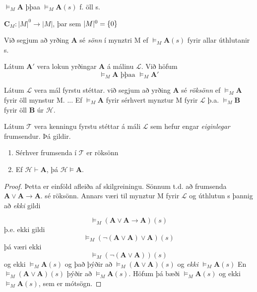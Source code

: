 \documentclass[12pt]{book}
\begin{document}
\begin{skgr}
  $\models_{M} \mathbf{A}$ þþaa $\models_{M} \mathbf{A}(s)$ f. öll s.
\end{skgr}

\begin{ath}
 $\mathbf{C}_{M}: |M|^{0} \rightarrow |M|$, þar sem $|M|^{0} = \{0\}$
\end{ath}




Við segjum að yrðing $\mathbf{A}$ sé \emph{sönn} í mynztri M ef
\( \models_{M} \mathbf{A} (s) \) fyrir allar úthlutanir s.

\begin{ath}
  Látum \(\mathbf{A}'\) vera lokun yrðingar \(\mathbf{A}\) á málinu
\(\mathcal{L} \). Við höfum
\[ \models_{M} \mathbf{A} \text{ þþaa } \models_{M} \mathbf{A}' \]
\end{ath}

\begin{skgr}
  Látum \( \mathcal{L} \) vera mál fyrstu stéttar. við segjum að yrðing $\mathbf{A}$
sé \emph{röksönn} ef  $\models_{M}\mathbf{A}$ fyrir öll mynstur M.
...
Ef \(\models_{M}\mathbf{A}\) fyrir sérhvert mynztur M fyrir \(\mathcal{L}\)
þ.a. $\models_{M} \mathbf{B}$ fyrir öll $\mathbf{B}$ úr $\mathcal{H}$. 
\end{skgr}


\begin{setn}
  Látum $\mathcal{T}$ vera kenningu fyrstu stéttar á máli \(\mathcal{L}\) sem
  hefur engar \emph{eiginlegar} frumsendur. Þá gildir.
  \begin{enumerate}[(1)]
  \item  Sérhver frumsenda í $\mathcal{T}$ er röksönn
  \item Ef $\mathcal{H} \vdash \mathbf{A}$, þá $\mathcal{H} \models \mathbf{A}$.
  \end{enumerate}

\end{setn}

\begin{proof}
  Þetta er einföld afleiða af skilgreiningu.
  Sönnum t.d. að frumsenda $\mathbf{A} \vee \mathbf{A} \rightarrow \mathbf{A}$.
  sé röksönn. Annars væri til mynztur M fyrir $\mathcal{L}$ og úthlutun s þannig að
  \emph{ekki} gildi 

  \[ \models_{M} (\mathbf{A} \vee \mathbf{A} \rightarrow \mathbf{A}) (s) \]
  þ.e. ekki gildi
  \[ \models_{M} ( \lnot ( \mathbf{A} \vee \mathbf{A} ) \vee \mathbf{A}) (s) \]
  þá væri ekki
  \[\models_{M} ( \lnot (\mathbf{A} \vee \mathbf{A}))(s)\] og ekki $\models_{M} \mathbf{A}(s)$
  og það þýðir að  \( \models_{M} (\mathbf{A} \vee \mathbf{A}) (s) \) og \emph{ekki} $\models_{M} \mathbf{A} (s)$
  En $\models_{M}( \mathbf{A} \vee \mathbf{A}) (s)$ þýðir að $\models_{M} \mathbf{A}(s)$. Höfum þá bæði
  $\models_{M} \mathbf{A}(s)$ og ekki $\models_{M} \mathbf{A}(s)$, sem er mótsögn.
\end{proof}
\end{document}
